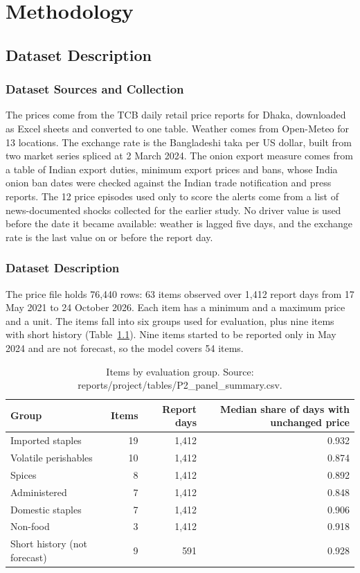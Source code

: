 \documentclass[12pt]{report}
\begin{document}
\chapter{Methodology}

\section{Dataset Description}

\subsection{Dataset Sources and Collection}
The prices come from the TCB daily retail price reports for Dhaka, downloaded as Excel sheets and converted to one table. Weather comes from Open-Meteo for 13 locations. The exchange rate is the Bangladeshi taka per US dollar, built from two market series spliced at 2 March 2024. The onion export measure comes from a table of Indian export duties, minimum export prices and bans, whose India onion ban dates were checked against the Indian trade notification and press reports. The 12 price episodes used only to score the alerts come from a list of news-documented shocks collected for the earlier study. No driver value is used before the date it became available: weather is lagged five days, and the exchange rate is the last value on or before the report day.

\subsection{Dataset Description}
The price file holds 76,440 rows: 63 items observed over 1,412 report days from 17 May 2021 to 24 October 2026. Each item has a minimum and a maximum price and a unit. The items fall into six groups used for evaluation, plus nine items with short history (Table~\ref{tab:strata}). Nine items started to be reported only in May 2024 and are not forecast, so the model covers 54 items.

\begin{table}[H]\centering\small
\caption{Items by evaluation group. Source: reports/project/tables/P2\_panel\_summary.csv.}\label{tab:strata}
\begin{tabular}{|l|r|r|r|}
\hline
\textbf{Group} & \textbf{Items} & \textbf{Report days} & \textbf{Median share of days with unchanged price} \\
\hline
Imported staples & 19 & 1,412 & 0.932 \\
\hline
Volatile perishables & 10 & 1,412 & 0.874 \\
\hline
Spices & 8 & 1,412 & 0.892 \\
\hline
Administered & 7 & 1,412 & 0.848 \\
\hline
Domestic staples & 7 & 1,412 & 0.906 \\
\hline
Non-food & 3 & 1,412 & 0.918 \\
\hline
Short history (not forecast) & 9 & 591 & 0.928 \\
\hline
\end{tabular}
\end{table}
\end{document}
